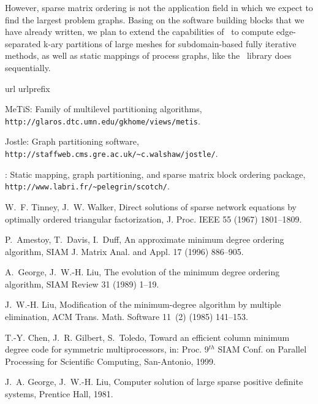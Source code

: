\documentclass[fleqn,12pt,twoside]{article}
\newcommand{\lbt}{\linebreak[2]}
\newcommand{\jostle}{{\sc Jostle}}               \newcommand{\metis}{\mbox{\sc Me$\!$T$\!$iS}}    \newcommand{\ometis}{\mbox{\sc O-Me$\!$T$\!$iS}} \newcommand{\parmetis}{\mbox{\sc ParMe$\!$T$\!$iS}}
\begin{document}
However, sparse matrix ordering is not the application field in which
we expect to find the largest problem graphs. Basing on the software
building blocks that we have already written, we plan to extend the
capabilities of \ptscotch\ to compute edge-separated k-ary partitions
of large meshes for subdomain-based fully iterative methods, as well
as static mappings of process graphs, like the \scotch\ library does
sequentially.





\begin{thebibliography}{10}
\expandafter\ifx\csname url\endcsname\relax
  \def\url#1{\texttt{#1}}\fi
\expandafter\ifx\csname urlprefix\endcsname\relax\def\urlprefix{URL }\fi

{\metis}: {F}amily of multilevel partitioning algorithms, {\tt http://\lbt
  glaros.\lbt dtc.\lbt umn.\lbt edu/\lbt gkhome/\lbt views/\lbt metis}.

{\jostle}: Graph partitioning software, {\tt http://\lbt staffweb.\lbo cms.\lbt
  gre.\lbt ac.\lbo uk/\lbt \~{}c.\lbo walshaw/\lbt jostle/}.

{\scotch}: Static mapping, graph partitioning, and sparse matrix block ordering
  package, {\tt http://\lbt www.\lbo labri.\lbo fr/\lbt \~{}pelegrin/\lbt
  scotch/}.

W.~F. Tinney, J.~W. Walker, Direct solutions of sparse network equations by
  optimally ordered triangular factorization, {J}. {P}roc. {IEEE} 55 (1967)
  1801--1809.

P.~Amestoy, T.~Davis, I.~Duff, An approximate minimum degree ordering
  algorithm, {SIAM} {J}. {M}atrix {A}nal. and {A}ppl. 17 (1996) 886--905.

A.~George, J.~W.-H. Liu, The evolution of the minimum degree ordering
  algorithm, {SIAM} {R}eview 31 (1989) 1--19.

J.~W.-H. Liu, Modification of the minimum-degree algorithm by multiple
  elimination, {ACM} {T}rans. {M}ath. {S}oftware 11~(2) (1985) 141--153.

T.-Y. Chen, J.~R. Gilbert, S.~Toledo, Toward an efficient column minimum degree
  code for symmetric multiprocessors, in: Proc. 9$^{th}$ {SIAM} {C}onf. on
  {P}arallel {P}rocessing for {S}cientific {C}omputing, San-Antonio, 1999.

J.~A. George, J.~W.-H. Liu, Computer solution of large sparse positive definite
  systems, Prentice Hall, 1981.


\end{thebibliography}
\end{document}
